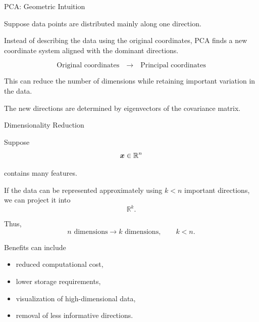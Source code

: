 
\begin{frame}{PCA: Geometric Intuition}

Suppose data points are distributed mainly along one
direction.

Instead of describing the data using the original
coordinates, PCA finds a new coordinate system aligned
with the dominant directions.

\[
\boxed{
\text{Original coordinates}
\quad\longrightarrow\quad
\text{Principal coordinates}
}
\]

This can reduce the number of dimensions while retaining
important variation in the data.

The new directions are determined by eigenvectors of
the covariance matrix.

\end{frame}



\begin{frame}{Dimensionality Reduction}

Suppose
\vspace{-0.1cm}
\[
\bm{x}\in\mathbb{R}^{n}
\]

contains many features.

If the data can be represented approximately using
$k<n$ important directions, we can project it into
\vspace{-0.1cm}
\[
\mathbb{R}^{k}.
\]

Thus,
\vspace{-0.1cm}
\[
\boxed{
n\text{ dimensions}
\longrightarrow
k\text{ dimensions},
\qquad k<n.
}
\]

Benefits can include

\begin{itemize}
    \item reduced computational cost,
    \item lower storage requirements,
    \item visualization of high-dimensional data,
    \item removal of less informative directions.
\end{itemize}

\end{frame}


